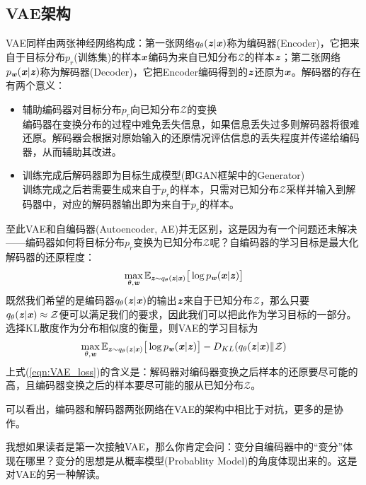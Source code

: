 \subsection{VAE架构}
VAE同样由两张神经网络构成：第一张网络$q_{\theta}(\boldsymbol{\mathit{z}}|\boldsymbol{\mathit{x}})$称为编码器(Encoder)，它把来自于目标分布$p_{r}$(训练集)的样本$\boldsymbol{\mathit{x}}$编码为来自已知分布$\mathcal{Z}$的样本$\boldsymbol{\mathit{z}}$；第二张网络$p_{\boldsymbol{\mathit{w}}}(\boldsymbol{\mathit{x}}|\boldsymbol{\mathit{z}})$称为解码器(Decoder)，它把Encoder编码得到的$\boldsymbol{\mathit{z}}$还原为$\boldsymbol{\mathit{x}}$。解码器的存在有两个意义：
\begin{itemize}
	\setlength{\itemsep}{0pt}
    \setlength{\parsep}{0pt}
    \setlength{\parskip}{0pt}
	\item 辅助编码器对目标分布$p_{r}$向已知分布$\mathcal{Z}$的变换\\
			编码器在变换分布的过程中难免丢失信息，如果信息丢失过多则解码器将很难还原。解码器会根据对原始输入的还原情况评估信息的丢失程度并传递给编码器，从而辅助其改进。
	\item 训练完成后解码器即为目标生成模型(即GAN框架中的Generator)\\
			训练完成之后若需要生成来自于$p_{r}$的样本，只需对已知分布$\mathcal{Z}$采样并输入到解码器中，对应的解码器输出即为来自于$p_{r}$的样本。
\end{itemize}
至此VAE和自编码器(Autoencoder, AE)并无区别，这是因为有一个问题还未解决——编码器如何将目标分布$p_{r}$变换为已知分布$\mathcal{Z}$呢？自编码器的学习目标是最大化解码器的还原程度：
\begin{eqnarray}
\max_{\theta,\boldsymbol{\mathit{w}}}\mathbb{E}_{\boldsymbol{\mathit{z}}\sim q_{\theta}(\boldsymbol{\mathit{z}}|\boldsymbol{\mathit{x}})}\big{[} \log p_{\boldsymbol{\mathit{w}}}(\boldsymbol{\mathit{x}}|\boldsymbol{\mathit{z}}) \big{]}
\end{eqnarray}
既然我们希望的是编码器$q_{\theta}(\boldsymbol{\mathit{z}}|\boldsymbol{\mathit{x}})$的输出$\boldsymbol{\mathit{z}}$来自于已知分布$\mathcal{Z}$，那么只要$q_{\theta}(\boldsymbol{\mathit{z}}|\boldsymbol{\mathit{x}})\approx\mathcal{Z}$便可以满足我们的要求，因此我们可以把此作为学习目标的一部分。选择KL散度作为分布相似度的衡量，则VAE的学习目标为
\begin{eqnarray}
\max_{\theta,\boldsymbol{\mathit{w}}}\mathbb{E}_{\boldsymbol{\mathit{z}}\sim q_{\theta}(\boldsymbol{\mathit{z}}|\boldsymbol{\mathit{x}})}\big{[} \log p_{\boldsymbol{\mathit{w}}}(\boldsymbol{\mathit{x}}|\boldsymbol{\mathit{z}}) \big{]} - D_{KL}(q_{\theta}(\boldsymbol{\mathit{z}}|\boldsymbol{\mathit{x}})\|\mathcal{Z}) \label{eqn:VAE_loss}
\end{eqnarray}
上式(\ref{eqn:VAE_loss})的含义是：解码器对编码器变换之后样本的还原要尽可能的高，且编码器变换之后的样本要尽可能的服从已知分布$\mathcal{Z}$。

可以看出，编码器和解码器两张网络在VAE的架构中相比于对抗，更多的是协作。

我想如果读者是第一次接触VAE，那么你肯定会问：变分自编码器中的“变分”体现在哪里？变分的思想是从概率模型(Probablity Model)的角度体现出来的。这是对VAE的另一种解读。

